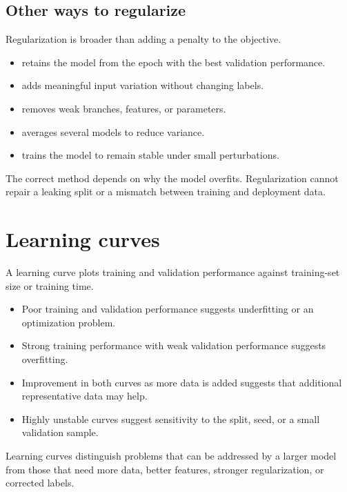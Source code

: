 \subsection{Other ways to regularize}

Regularization is broader than adding a penalty to the objective.

\begin{itemize}
  \item {} retains the model from the epoch with the best validation performance.
  \item {} adds meaningful input variation without changing labels.
    \item {} removes weak branches, features, or parameters.
  \item {} averages several models to reduce variance.
  \item {} trains the model to remain stable under small perturbations.
\end{itemize}

The correct method depends on why the model overfits. Regularization cannot repair a leaking split or a mismatch between training and deployment data.

\section{Learning curves}

A learning curve plots training and validation performance against training-set size or training time.

\begin{itemize}
  \item Poor training and validation performance suggests underfitting or an optimization problem.
  \item Strong training performance with weak validation performance suggests overfitting.
  \item Improvement in both curves as more data is added suggests that additional representative data may help.
  \item Highly unstable curves suggest sensitivity to the split, seed, or a small validation sample.
\end{itemize}

Learning curves distinguish problems that can be addressed by a larger model from those that need more data, better features, stronger regularization, or corrected labels.

